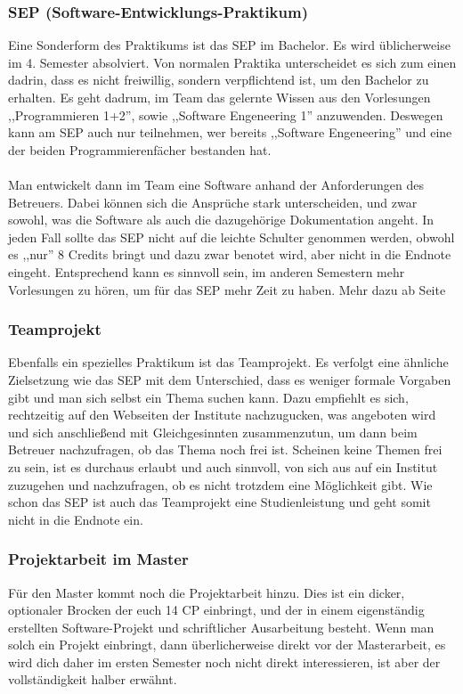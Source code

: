 \subsubsection*{SEP (Software-Entwicklungs-Praktikum)}
Eine Sonderform des Praktikums ist das SEP im Bachelor. Es wird
üblicherweise im 4. Semester absolviert. Von normalen Praktika
unterscheidet es sich zum einen dadrin, dass es nicht freiwillig,
sondern verpflichtend ist, um den Bachelor zu erhalten. Es geht
dadrum, im Team das gelernte Wissen aus den Vorlesungen
,,Programmieren 1+2'', sowie ,,Software Engeneering 1''
anzuwenden. Deswegen kann am SEP auch nur teilnehmen, wer bereits
,,Software Engeneering'' und eine der beiden Programmierenfächer
bestanden hat.\\\\
Man entwickelt dann im Team eine Software anhand der Anforderungen des
Betreuers. Dabei können sich die Ansprüche stark unterscheiden, und
zwar sowohl, was die Software als auch die dazugehörige Dokumentation
angeht. In jeden Fall sollte das SEP nicht auf die leichte Schulter
genommen werden, obwohl es ,,nur'' 8 Credits bringt und dazu zwar
benotet wird, aber nicht in die Endnote eingeht. Entsprechend kann es
sinnvoll sein, im anderen Semestern mehr Vorlesungen zu hören, um für
das SEP mehr Zeit zu haben. Mehr dazu ab Seite \pageref{bach_studienplan}

\subsubsection*{Teamprojekt}
Ebenfalls ein spezielles Praktikum ist das Teamprojekt. Es verfolgt
eine ähnliche Zielsetzung wie das SEP mit dem Unterschied, dass es
weniger formale Vorgaben gibt und man sich selbst ein Thema suchen
kann. Dazu empfiehlt es sich, rechtzeitig auf den Webseiten der
Institute nachzugucken, was angeboten wird und sich anschließend mit
Gleichgesinnten zusammenzutun, um dann beim Betreuer nachzufragen, ob
das Thema noch frei ist. Scheinen keine Themen frei zu sein, ist es
durchaus erlaubt und auch sinnvoll, von sich aus auf ein Institut
zuzugehen und nachzufragen, ob es nicht trotzdem eine Möglichkeit
gibt. Wie schon das SEP ist auch das Teamprojekt eine Studienleistung
und geht somit nicht in die Endnote ein.

\subsubsection*{Projektarbeit im Master}
Für den Master kommt noch die Projektarbeit hinzu. Dies ist ein dicker, 
optionaler Brocken der euch 14 CP einbringt, und der in einem eigenständig 
erstellten Software-Projekt und schriftlicher Ausarbeitung besteht. 
Wenn man solch ein Projekt einbringt, dann überlicherweise direkt vor der 
Masterarbeit, es wird dich daher im ersten Semester noch nicht direkt 
interessieren, ist aber der vollständigkeit halber erwähnt.

